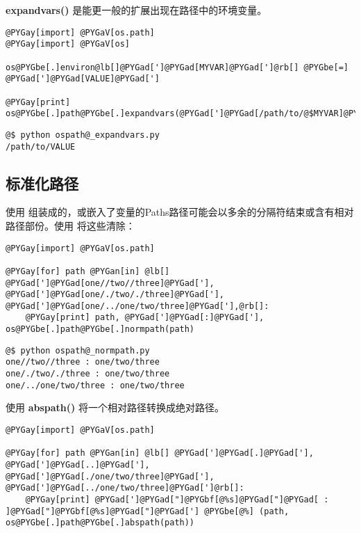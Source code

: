\documentclass[a4paper,10pt,english]{manual}
\begin{document}
\textbf{expandvars()} 是能更一般的扩展出现在路径中的环境变量。

\begin{Verbatim}[commandchars=@\[\]]
@PYGay[import] @PYGaV[os.path]
@PYGay[import] @PYGaV[os]

os@PYGbe[.]environ@lb[]@PYGad[']@PYGad[MYVAR]@PYGad[']@rb[] @PYGbe[=] @PYGad[']@PYGad[VALUE]@PYGad[']

@PYGay[print] os@PYGbe[.]path@PYGbe[.]expandvars(@PYGad[']@PYGad[/path/to/@$MYVAR]@PYGad['])
\end{Verbatim}

\begin{Verbatim}[commandchars=@\[\]]
@$ python ospath@_expandvars.py
/path/to/VALUE
\end{Verbatim}


\subsection{标准化路径}

使用  组装成的，或嵌入了变量的Paths路径可能会以多余的分隔符结束或含有相对路径部份。使用  将这些清除：

\begin{Verbatim}[commandchars=@\[\]]
@PYGay[import] @PYGaV[os.path]

@PYGay[for] path @PYGan[in] @lb[] @PYGad[']@PYGad[one//two//three]@PYGad['], @PYGad[']@PYGad[one/./two/./three]@PYGad['], @PYGad[']@PYGad[one/../one/two/three]@PYGad['],@rb[]:
    @PYGay[print] path, @PYGad[']@PYGad[:]@PYGad['], os@PYGbe[.]path@PYGbe[.]normpath(path)
\end{Verbatim}

\begin{Verbatim}[commandchars=@\[\]]
@$ python ospath@_normpath.py
one//two//three : one/two/three
one/./two/./three : one/two/three
one/../one/two/three : one/two/three
\end{Verbatim}

使用 \textbf{abspath()} 将一个相对路径转换成绝对路径。

\begin{Verbatim}[commandchars=@\[\]]
@PYGay[import] @PYGaV[os.path]

@PYGay[for] path @PYGan[in] @lb[] @PYGad[']@PYGad[.]@PYGad['], @PYGad[']@PYGad[..]@PYGad['], @PYGad[']@PYGad[./one/two/three]@PYGad['], @PYGad[']@PYGad[../one/two/three]@PYGad[']@rb[]:
    @PYGay[print] @PYGad[']@PYGad["]@PYGbf[@%s]@PYGad["]@PYGad[ : ]@PYGad["]@PYGbf[@%s]@PYGad["]@PYGad['] @PYGbe[@%] (path, os@PYGbe[.]path@PYGbe[.]abspath(path))
\end{Verbatim}
\end{document}
